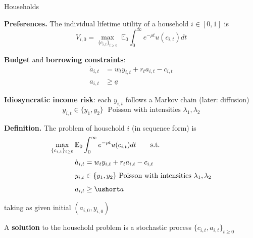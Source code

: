 \documentclass[11pt, aspectratio=169]{beamer}
\begin{document}
\begin{frame}{Households}

\vspace{3mm}
\textbf{Preferences.} The individual lifetime utility of a household $i \in [0, 1]$ is 
\begin{equation*}
	V_{i, 0} = \max_{ \{c_{i, t}\}_{t \geq 0} } \; \mathbb E_0 \int_0^\infty e^{- \rho t} u(c_{i, t}) dt
\end{equation*}


\vspace{5mm}
\textbf{Budget} and \textbf{borrowing constraints}:
\begin{align*}
	\dot a_{i, t} &= w_t y_{i, t} + r_t a_{i, t} - c_{i, t} \\[2pt]
	a_{i, t} &\geq \underline a
\end{align*}


\vspace{5mm}
\textbf{Idiosyncratic income risk}: each $y_{i, t}$ follows a Markov chain (later: diffusion)
\begin{equation*}
	y_{i, t} \in \{y_1, y_2\} \; \text{ Poisson with intensities } \lambda_1, \lambda_2
\end{equation*}

\end{frame}


\begin{frame}{}

\vspace{5mm}
\textbf{Definition.} The problem of household $i$ (in sequence form) is 
\begin{equation*}\label{HH}\begin{split}
	\max_{\{c_{i, t}\}_{t \geq 0}} \, 
		& \mathbb E_0 \int_0^\infty e^{-\rho t} u(c_{i, t}) dt \quad \quad \mbox{s.t.} \\[2pt]
		&\dot a_{i, t} = w_t y_{i, t} + r_t a_{i, t} - c_{i, t} \\[4pt]
		&y_{i, t} \in \{y_1, y_2\} \ \mbox{Poisson with intensities} \ \lambda_1,\lambda_2\\[4pt]
		&a_{i, t} \geq \ushort a \end{split}
\end{equation*}

\vspace{2mm}
\noindent
taking as given initial $(a_{i, 0}, y_{i, 0})$

\vspace{4mm}
\noindent
A \textbf{solution} to the household problem is a stochastic process $\{c_{i, t}, a_{i, t}\}_{t \geq 0}$
\end{frame}
\end{document}
